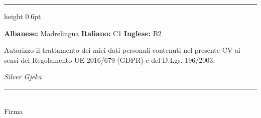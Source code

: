 \documentclass[a4paper,11pt]{article}
\newcommand{\cvsec}[1]{\vspace{7pt}{\large\scshape #1}\par\vspace{1.5pt}\hrule height 0.6pt\vspace{5pt}}
\begin{document}
\cvsec{Lingue}

\textbf{Albanese:} Madrelingua \quad \textbf{Italiano:} C1 \quad \textbf{Inglese:} B2

\vspace{8pt}
{\footnotesize Autorizzo il trattamento dei miei dati personali contenuti nel presente CV ai sensi del Regolamento UE 2016/679 (GDPR) e del D.Lgs. 196/2003.\par}

\vspace{18pt}
\begin{flushright}
{\itshape\Large Silver Gjeka}\\[6pt]
\rule{5.5cm}{0.4pt}\\
{\footnotesize Firma}
\end{flushright}
\end{document}
